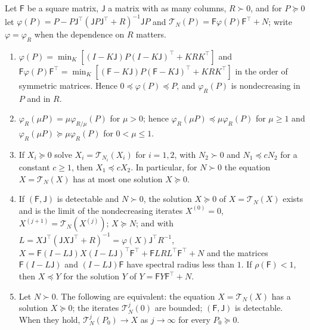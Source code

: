 \begin{lemma}\label{lem:apx-riccati}
Let $\mathsf F$ be a square matrix, $\mathsf J$ a matrix with as many columns, $R\succ0$, and for $P\succeq0$ let $\varphi(P)=P-P\mathsf J^\top(\mathsf JP\mathsf J^\top+R)^{-1}\mathsf JP$ and $\mathcal T_N(P)=\mathsf F\varphi(P)\mathsf F^\top+N$; write $\varphi=\varphi_R$ when the dependence on $R$ matters.
\begin{enumerate}
\item[(a)] $\varphi(P)=\min_K[(I-K\mathsf J)P(I-K\mathsf J)^\top+KRK^\top]$ and $\mathsf F\varphi(P)\mathsf F^\top=\min_K[(\mathsf F-K\mathsf J)P(\mathsf F-K\mathsf J)^\top+KRK^\top]$ in the order of symmetric matrices. Hence $0\preceq\varphi(P)\preceq P$, and $\varphi_R(P)$ is nondecreasing in $P$ and in $R$.
\item[(b)] $\varphi_R(\mu P)=\mu\varphi_{R/\mu}(P)$ for $\mu>0$; hence $\varphi_R(\mu P)\preceq\mu\varphi_R(P)$ for $\mu\ge1$ and $\varphi_R(\mu P)\succeq\mu\varphi_R(P)$ for $0<\mu\le1$.
\item[(c)] If $X_i\succeq0$ solve $X_i=\mathcal T_{N_i}(X_i)$ for $i=1,2$, with $N_2\succ0$ and $N_1\preceq cN_2$ for a constant $c\ge1$, then $X_1\preceq cX_2$. In particular, for $N\succ0$ the equation $X=\mathcal T_N(X)$ has at most one solution $X\succeq0$.
\item[(d)] If $(\mathsf F,\mathsf J)$ is detectable and $N\succ0$, the solution $X\succeq0$ of $X=\mathcal T_N(X)$ exists and is the limit of the nondecreasing iterates $X^{(0)}=0$, $X^{(j+1)}=\mathcal T_N(X^{(j)})$; $X\succeq N$; and with $L=X\mathsf J^\top(\mathsf JX\mathsf J^\top+R)^{-1}=\varphi(X)\mathsf J^\top R^{-1}$, $X=\mathsf F(I-L\mathsf J)X(I-L\mathsf J)^\top\mathsf F^\top+\mathsf FLRL^\top\mathsf F^\top+N$ and the matrices $\mathsf F(I-L\mathsf J)$ and $(I-L\mathsf J)\mathsf F$ have spectral radius less than $1$. If $\rho(\mathsf F)<1$, then $X\preceq Y$ for the solution $Y$ of $Y=\mathsf FY\mathsf F^\top+N$.
\item[(e)] Let $N\succ0$. The following are equivalent: the equation $X=\mathcal T_N(X)$ has a solution $X\succeq0$; the iterates $\mathcal T_N^j(0)$ are bounded; $(\mathsf F,\mathsf J)$ is detectable. When they hold, $\mathcal T_N^j(P_0)\to X$ as $j\to\infty$ for every $P_0\succeq0$.
\end{enumerate}
\end{lemma}

